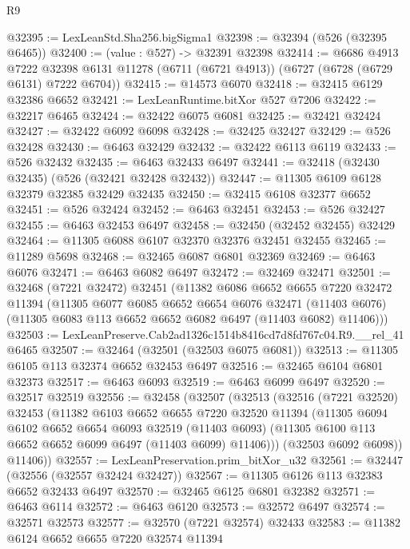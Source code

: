 \begin{lexlean}{R9}
\begin{coremodule}
@32395 := LexLeanStd.Sha256.bigSigma1
@32398 := @32394 (@526 (@32395 @6465))
@32400 := (value : @527) -> @32391 @32398
@32414 := @6686
    @4913
    @7222
    @32398
    @6131
    @11278
    (@6711 (@6721 @4913))
    (@6727 (@6728 (@6729 @6131) @7222 @6704))
@32415 := @14573 @6070
@32418 := @32415 @6129 @32386 @6652
@32421 := LexLeanRuntime.bitXor @527 @7206
@32422 := @32217 @6465
@32424 := @32422 @6075 @6081
@32425 := @32421 @32424
@32427 := @32422 @6092 @6098
@32428 := @32425 @32427
@32429 := @526 @32428
@32430 := @6463 @32429
@32432 := @32422 @6113 @6119
@32433 := @526 @32432
@32435 := @6463 @32433 @6497
@32441 := @32418 (@32430 @32435) (@526 (@32421 @32428 @32432))
@32447 := @11305 @6109 @6128 @32379 @32385 @32429 @32435
@32450 := @32415 @6108 @32377 @6652
@32451 := @526 @32424
@32452 := @6463 @32451
@32453 := @526 @32427
@32455 := @6463 @32453 @6497
@32458 := @32450 (@32452 @32455) @32429
@32464 := @11305 @6088 @6107 @32370 @32376 @32451 @32455
@32465 := @11289 @5698
@32468 := @32465 @6087 @6801 @32369
@32469 := @6463 @6076
@32471 := @6463 @6082 @6497
@32472 := @32469 @32471
@32501 := @32468
    (@7221 @32472)
    @32451
    (@11382
      @6086
      @6652
      @6655
      @7220
      @32472
      @11394
      (@11305
        @6077
        @6085
        @6652
        @6654
        @6076
        @32471
        (@11403 @6076)
        (@11305 @6083 @113 @6652 @6652 @6082 @6497 (@11403 @6082) @11406)))
@32503 := LexLeanPreserve.Cab2ad1326c1514b8416cd7d8fd767c04.R9.__rel_41 @6465
@32507 := @32464 (@32501 (@32503 @6075 @6081))
@32513 := @11305 @6105 @113 @32374 @6652 @32453 @6497
@32516 := @32465 @6104 @6801 @32373
@32517 := @6463 @6093
@32519 := @6463 @6099 @6497
@32520 := @32517 @32519
@32556 := @32458
    (@32507
      (@32513
        (@32516
          (@7221 @32520)
          @32453
          (@11382
            @6103
            @6652
            @6655
            @7220
            @32520
            @11394
            (@11305
              @6094
              @6102
              @6652
              @6654
              @6093
              @32519
              (@11403 @6093)
              (@11305 @6100 @113 @6652 @6652 @6099 @6497 (@11403 @6099) @11406)))
          (@32503 @6092 @6098))
        @11406))
@32557 := LexLeanPreservation.prim_bitXor_u32
@32561 := @32447 (@32556 (@32557 @32424 @32427))
@32567 := @11305 @6126 @113 @32383 @6652 @32433 @6497
@32570 := @32465 @6125 @6801 @32382
@32571 := @6463 @6114
@32572 := @6463 @6120
@32573 := @32572 @6497
@32574 := @32571 @32573
@32577 := @32570 (@7221 @32574) @32433
@32583 := @11382 @6124 @6652 @6655 @7220 @32574 @11394

\end{coremodule}
\end{lexlean}

